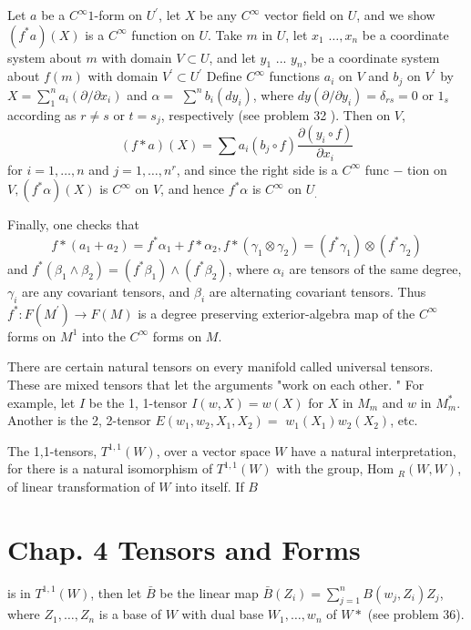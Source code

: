 \documentclass[10pt]{article}
\begin{document}
Let $a$ be a $C^{\infty} 1$-form on $U^{\prime}$, let $X$ be any $C^{\infty}$ vector field on $U$, and we show $\left(f^{*} a\right)(X)$ is a $C^{\infty}$ function on $U$. Take $m$ in $U$, let $x_{1}$ $\ldots, x_{n}$ be a coordinate system about $m$ with domain $V \subset U$, and let $y_{1}$ ... $y_{n}$, be a coordinate system about $f(m)$ with domain $V^{\prime} \subset U^{\prime}$ Define $C^{\infty}$ functions $a_{i}$ on $V$ and $b_{j}$ on $V^{\prime}$ by $X=\sum_{1}^{n} a_{i}\left(\partial / \partial x_{i}\right)$ and $\alpha=$ $\sum^{n} b_{i}\left(d y_{i}\right)$, where $d y\left(\partial / \partial y_{i}\right)=\delta_{r s}=0$ or $1_{s}$ according as $r \neq s$ or $t=s_{j}$, respectively (see problem 32 ). Then on $V$,
$$
(f * a)(X)=\sum a_{i}\left(b_{j} \circ f\right) \frac{\partial\left(y_{i} \circ f\right)}{\partial x_{i}}
$$
for $i=1, \ldots, n$ and $j=1, \ldots, n^{r}$, and since the right side is a $C^{\infty}$ func $-$ tion on $V,\left(f^{*} \alpha\right)(X)$ is $C^{\infty}$ on $V$, and hence $f^{*} \alpha$ is $C^{\infty}$ on $U_{.}$

Finally, one checks that
$$
f *\left(a_{1}+a_{2}\right)=f^{*} \alpha_{1}+f * \alpha_{2}, f *\left(\gamma_{1} \otimes \gamma_{2}\right)=\left(f^{*} \gamma_{1}\right) \otimes\left(f^{*} \gamma_{2}\right)
$$
and $f^{*}\left(\beta_{1} \wedge \beta_{2}\right)=\left(f^{*} \beta_{1}\right) \wedge\left(f^{*} \beta_{2}\right)$, where $\alpha_{i}$ are tensors of the same degree, $\gamma_{i}$ are any covariant tensors, and $\beta_{i}$ are alternating covariant tensors. Thus $f^{*}: F\left(M^{\prime}\right) \rightarrow F(M)$ is a degree preserving exterior-algebra map of the $C^{\infty}$ forms on $M^{1}$ into the $C^{\infty}$ forms on $M .$

There are certain natural tensors on every manifold called universal tensors. These are mixed tensors that let the arguments "work on each other. " For example, let $I$ be the 1, 1-tensor $I(w, X)=w(X)$ for $X$ in $M_{m}$ and $w$ in $M_{m}^{*}$. Another is the 2, 2-tensor $E\left(w_{1}, w_{2}, X_{1}, X_{2}\right)=$ $w_{1}\left(X_{1}\right) w_{2}\left(X_{2}\right)$, etc.

The 1,1-tensors, $T^{1,1}(W)$, over a vector space $W$ have a natural interpretation, for there is a natural isomorphism of $T^{1,1}(W)$ with the group, Hom ${ }_{R}(W, W)$, of linear transformation of $W$ into itself. If $B$

\section{Chap. 4 Tensors and Forms}
is in $T^{1,1}(W)$, then let $\bar{B}$ be the linear map $\bar{B}\left(Z_{i}\right)=\sum_{j=1}^{n} B\left(w_{j}, Z_{i}\right) Z_{j}$, where $Z_{1}, \ldots, Z_{n}$ is a base of $W$ with dual base $W_{1}, \ldots, w_{n}$ of $W *$ (see problem 36).
\end{document}
